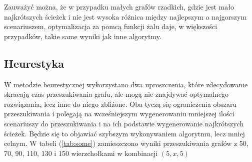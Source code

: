 \documentclass[10pt]{article}
\begin{document}
Zauważyć można, że w przypadku małych grafów rzadkich, gdzie jest mało najkrótszych ścieżek i nie jest wysoka różnica między najlepszym a najgorszym scenariuszem, optymalizacja za pomcą funkcji żalu daje, w większości przypadków, takie same wyniki jak inne algorytmy.

\subsection{Heurestyka}
W metodzie heurestycznej wykorzystano dwa uproszczenia, które zdecydowanie skracają czas przeszukiwania grafu, ale mogą nie znajdywać optymalnego rozwiązania, lecz inne do niego zbliżone. Oba tyczą się ograniczenia obszaru przeszukiwania i polegają na wcześniejszym wygenerowaniu mniejszej ilości scenariuszy do przeszukiwania i na ich podstawie wygenerowanie najkrótszych ścieżek. Będzie się to objawiać szybszym wykonywaniem algorytmu, lecz mniej celnym. W tabeli (\ref{tab:some}) zamieszczono wyniki przeszukiwania grafów z 50, 70, 90, 110, 130 i 150 wierzchołkami w kombinacji $(5, x, 5)$
\end{document}
